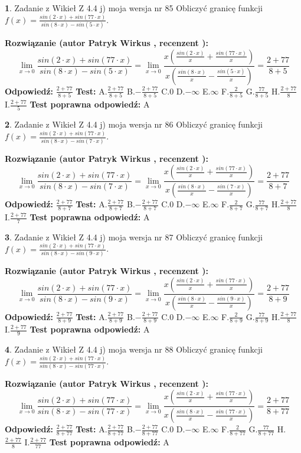 \documentclass[12pt, a4paper]{article}
\theoremstyle{definition} %
\newtheorem{zad}{}
\newcommand{\zadStart}[1]{\begin{zad}#1\newline}
\newcommand{\zadStop}{\end{zad}}
\newcommand{\rozwStart}[2]{\noindent \textbf{Rozwiązanie (autor #1 , recenzent #2): }\newline}
\newcommand{\rozwStop}{\newline}
\newcommand{\odpStart}{\noindent \textbf{Odpowiedź:}\newline}
\newcommand{\odpStop}{\newline}
\newcommand{\testStart}{\noindent \textbf{Test:}\newline}
\newcommand{\testStop}{\newline}
\newcommand{\kluczStart}{\noindent \textbf{Test poprawna odpowiedź:}\newline}
\newcommand{\kluczStop}{\newline}
\begin{document}
\zadStart{Zadanie z Wikieł Z 4.4 j) moja wersja nr 85}
Obliczyć granicę funkcji $f(x)=\frac{sin(2\cdot x) +sin(77\cdot x)}{sin(8\cdot x) -sin(5\cdot x)}$.
\zadStop
\rozwStart{Patryk Wirkus}{}
$$\lim\limits_{x\to 0}\frac{sin(2\cdot x) +sin(77\cdot x)}{sin(8\cdot x) -sin(5\cdot x)}=\lim\limits_{x\to 0}\frac{x(\frac{sin(2\cdot x)}{x}+\frac{sin(77\cdot x)}{x})}{x(\frac{sin(8\cdot x)}{x}-\frac{sin(5\cdot x)}{x})}=\frac{2+77}{8+5}$$
\rozwStop
\odpStart
$\frac{2+77}{8+5}$
\odpStop
\testStart
A.$\frac{2+77}{8+5}$
B.$-\frac{2+77}{8+5}$
C.$0$
D.$-\infty$
E.$\infty$
F.$\frac{2}{8+5}$
G.$\frac{77}{8+5}$
H.$\frac{2+77}{8}$
I.$\frac{2+77}{5}$
\testStop
\kluczStart
A
\kluczStop



\zadStart{Zadanie z Wikieł Z 4.4 j) moja wersja nr 86}
Obliczyć granicę funkcji $f(x)=\frac{sin(2\cdot x) +sin(77\cdot x)}{sin(8\cdot x) -sin(7\cdot x)}$.
\zadStop
\rozwStart{Patryk Wirkus}{}
$$\lim\limits_{x\to 0}\frac{sin(2\cdot x) +sin(77\cdot x)}{sin(8\cdot x) -sin(7\cdot x)}=\lim\limits_{x\to 0}\frac{x(\frac{sin(2\cdot x)}{x}+\frac{sin(77\cdot x)}{x})}{x(\frac{sin(8\cdot x)}{x}-\frac{sin(7\cdot x)}{x})}=\frac{2+77}{8+7}$$
\rozwStop
\odpStart
$\frac{2+77}{8+7}$
\odpStop
\testStart
A.$\frac{2+77}{8+7}$
B.$-\frac{2+77}{8+7}$
C.$0$
D.$-\infty$
E.$\infty$
F.$\frac{2}{8+7}$
G.$\frac{77}{8+7}$
H.$\frac{2+77}{8}$
I.$\frac{2+77}{7}$
\testStop
\kluczStart
A
\kluczStop



\zadStart{Zadanie z Wikieł Z 4.4 j) moja wersja nr 87}
Obliczyć granicę funkcji $f(x)=\frac{sin(2\cdot x) +sin(77\cdot x)}{sin(8\cdot x) -sin(9\cdot x)}$.
\zadStop
\rozwStart{Patryk Wirkus}{}
$$\lim\limits_{x\to 0}\frac{sin(2\cdot x) +sin(77\cdot x)}{sin(8\cdot x) -sin(9\cdot x)}=\lim\limits_{x\to 0}\frac{x(\frac{sin(2\cdot x)}{x}+\frac{sin(77\cdot x)}{x})}{x(\frac{sin(8\cdot x)}{x}-\frac{sin(9\cdot x)}{x})}=\frac{2+77}{8+9}$$
\rozwStop
\odpStart
$\frac{2+77}{8+9}$
\odpStop
\testStart
A.$\frac{2+77}{8+9}$
B.$-\frac{2+77}{8+9}$
C.$0$
D.$-\infty$
E.$\infty$
F.$\frac{2}{8+9}$
G.$\frac{77}{8+9}$
H.$\frac{2+77}{8}$
I.$\frac{2+77}{9}$
\testStop
\kluczStart
A
\kluczStop



\zadStart{Zadanie z Wikieł Z 4.4 j) moja wersja nr 88}
Obliczyć granicę funkcji $f(x)=\frac{sin(2\cdot x) +sin(77\cdot x)}{sin(8\cdot x) -sin(77\cdot x)}$.
\zadStop
\rozwStart{Patryk Wirkus}{}
$$\lim\limits_{x\to 0}\frac{sin(2\cdot x) +sin(77\cdot x)}{sin(8\cdot x) -sin(77\cdot x)}=\lim\limits_{x\to 0}\frac{x(\frac{sin(2\cdot x)}{x}+\frac{sin(77\cdot x)}{x})}{x(\frac{sin(8\cdot x)}{x}-\frac{sin(77\cdot x)}{x})}=\frac{2+77}{8+77}$$
\rozwStop
\odpStart
$\frac{2+77}{8+77}$
\odpStop
\testStart
A.$\frac{2+77}{8+77}$
B.$-\frac{2+77}{8+77}$
C.$0$
D.$-\infty$
E.$\infty$
F.$\frac{2}{8+77}$
G.$\frac{77}{8+77}$
H.$\frac{2+77}{8}$
I.$\frac{2+77}{77}$
\testStop
\kluczStart
A
\kluczStop
\end{document}
